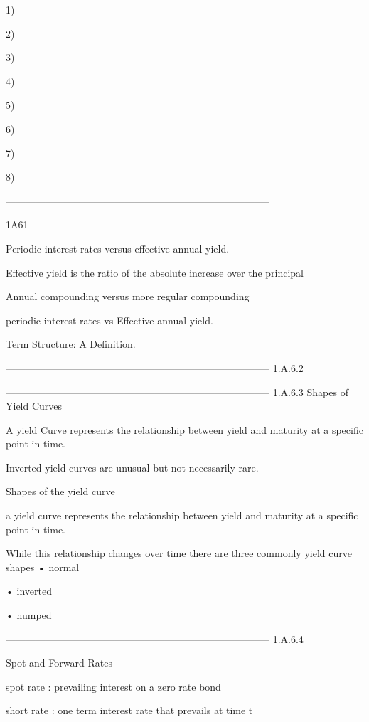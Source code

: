1)

2)

3)

4)

5) 

6)

7) 

8) 




--------------------------------------------------------------------------------


1A61

Periodic interest rates versus effective annual yield.

Effective yield is the ratio of the absolute increase over the principal




Annual compounding versus more regular compounding

periodic interest rates vs Effective annual yield.


Term Structure: A Definition.




--------------------------------------------------------------------------------
1.A.6.2





--------------------------------------------------------------------------------
1.A.6.3 Shapes of Yield Curves


A yield Curve represents the relationship between yield and maturity at a specific point in time.


Inverted yield curves are unusual but not necessarily rare.


Shapes of the yield curve

a yield curve represents the relationship between yield and maturity at a specific point in time.

While this relationship changes over time there are three commonly yield curve shapes
•
normal

•
inverted

•
humped






--------------------------------------------------------------------------------
1.A.6.4

Spot and Forward Rates


spot rate : prevailing interest on a zero rate bond

short rate : one term interest rate that prevails at time t


